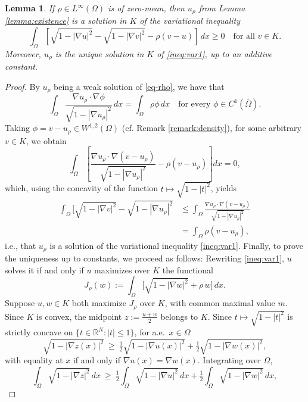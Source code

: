 \documentclass[11pt,reqno]{amsart}
\theoremstyle{plain}
\newtheorem{lemma}[theorem]{Lemma}
\theoremstyle{definition}
\numberwithin{equation}{section}
\begin{document}
\begin{lemma} \label{lemma:crit}
    If $\rho \in L^{\infty}(\Omega)$ is of zero-mean, then $u_\rho$ from Lemma \ref{lemma:existence} is a solution in $K$ of the variational inequality
    \begin{equation}
    \label{ineq:var1}
    \int_{\Omega} [\sqrt{1-|\nabla u|^2} - \sqrt{1-|\nabla v|^2} - \rho (v-u) ] \, dx \geq 0 \quad \text{for all } v\in K.  \end{equation}
    Moreover, $u_\rho$ is the unique solution in $K$ of \eqref{ineq:var1}, up to an additive constant.
\end{lemma}
\begin{proof}

    By $u_\rho$ being a weak solution of \eqref{eq-rho}, we have that
    $$\int_\Omega \frac{\nabla u_\rho \cdot \nabla \phi}{\sqrt{1-|\nabla u_\rho|^2}} \,dx = \int_\Omega \rho \phi \,dx \quad \text{for every } \phi \in C^1(\overline{\Omega}).$$
    Taking $\phi = v-u_\rho \in W^{1,2}(\Omega)$ (cf. Remark \ref{remark:density}), for some arbitrary $v \in K$, we obtain
    $$\int_\Omega \left[  \frac{ \nabla u_\rho \cdot \nabla(v-u_\rho) }{\sqrt{1-|\nabla u_\rho|^2}} - \rho(v-u_\rho)\right] dx = 0, $$
    which, using the concavity of the function $t \mapsto \sqrt{1-|t|^2}$, yields
    $$\begin{aligned} \int_{\Omega} [ \sqrt{1-|\nabla v|^2} - \sqrt{1-|\nabla u_\rho|^2} &\leq  \int_\Omega \frac{ \nabla u_\rho \cdot \nabla(v-u_\rho) }{\sqrt{1-|\nabla u_\rho|^2}} \\
    &=\int_\Omega \rho(v-u_\rho),\end{aligned} $$
    i.e., that $u_\rho$ is a solution of the variational inequality \eqref{ineq:var1}. Finally, to prove the uniqueness up to constants, we proceed as follows: Rewriting \eqref{ineq:var1}, $u$ solves it if and only if $u$ maximizes over $K$ the functional
$$
J_\rho(w):=\int_\Omega\Big[\sqrt{1-|\nabla w|^2}+\rho\, w\Big]\,dx.
$$
Suppose $u,w\in K$ both maximize $J_\rho$ over $K$, with common maximal value $m$. Since $K$ is convex, the midpoint $z:=\tfrac{u+w}{2}$ belongs to $K$. Since $t\mapsto\sqrt{1-|t|^2}$ is strictly concave on $\{t\in\mathbb{R}^N:|t|\le1\}$, for a.e.\ $x\in\Omega$
$$
\sqrt{1-|\nabla z(x)|^2}\ \ge\ \tfrac12\sqrt{1-|\nabla u(x)|^2}+\tfrac12\sqrt{1-|\nabla w(x)|^2},
$$
with equality at $x$ if and only if $\nabla u(x)=\nabla w(x)$. Integrating over $\Omega$,
\begin{equation}\label{eq:strict-concavity}
\int_\Omega \sqrt{1-|\nabla z|^2}\,dx\ \ge\ \tfrac12\int_\Omega\sqrt{1-|\nabla u|^2}\,dx+\tfrac12\int_\Omega\sqrt{1-|\nabla w|^2}\,dx,

\end{equation}
\end{proof}
\end{document}
